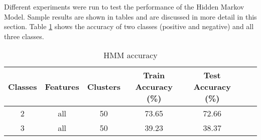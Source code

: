 
\begin{comment}
Experiments / Empirical evaluation (roughly 2-3 pages)
• Any details about experiments (dataset sizes, parameter selection, etc)
• Results
• Analysis (discussion of results / visualization / findings / etc)
\end{comment}

Different experiments were run to test the performance of the Hidden Markov Model. Sample results are shown in tables and are discussed in more detail in this section. Table \ref{table:HMMaccuracy} shows the accuracy of two classes (positive and negative) and all three classes. 

\begin{table}[h!]
\begin{center}
\begin{tabular}{| c | c | c | c | c | c | c |}
\hline
 {\textbf{Classes}} 			& {\textbf{Features}}	& {\textbf{Clusters}} 
 & {\textbf{Train Accuracy (\%)}} 					& {\textbf{Test Accuracy (\%)}} 
 \\
\hline
2 			& all 	& 50			& 73.65		& 72.66 		\\ %
3 			& all	& 50			& 39.23		& 38.37 		\\
\hline
\end{tabular}
\caption{HMM accuracy}
\label{table:HMMaccuracy}
\end{center}
\end{table}

\begin{comment}
\begin{table}[h!]
\begin{center}
\begin{tabular}{| c | c | c | c | c | c |}
\hline
 {\textbf{Classes}} 	
 & {\textbf{Data per class}} 					& {\textbf{Clusters}} 
 & {\textbf{Train Accuracy (\%)}} 					& {\textbf{Test Accuracy (\%)}} 
 \\
\hline
2 			& 500 		& 50			& 73.65		& 72.66 		\\ %
3 			& 500 		& 50			& 39.23		& 38.37 		\\
\hline
\end{tabular}
\caption{HMM accuracy}
\label{table:HMMaccuracy}
\end{center}
\end{table}
\end{comment}

